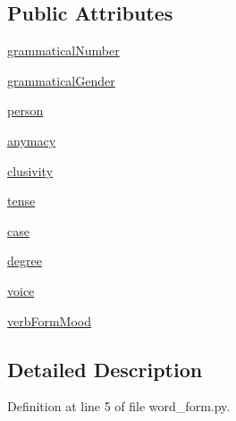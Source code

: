 \subsection*{Public Attributes}
\begin{DoxyCompactItemize}
\item 
\hyperlink{classsrc_1_1morphology_1_1word__form_1_1_word_form_affc0a3ba96904019be2b92d55e832bcb}{grammatical\+Number}
\item 
\hyperlink{classsrc_1_1morphology_1_1word__form_1_1_word_form_a44467b3575140671b680bca5ee0b0483}{grammatical\+Gender}
\item 
\hyperlink{classsrc_1_1morphology_1_1word__form_1_1_word_form_a8c2487c9b360cc067bcb40ee7cf8d8c5}{person}
\item 
\hyperlink{classsrc_1_1morphology_1_1word__form_1_1_word_form_aa82c3234c1c9f209b7b8d6b2e3c3c246}{anymacy}
\item 
\hyperlink{classsrc_1_1morphology_1_1word__form_1_1_word_form_a04e4f04ce56e4a9628b8ceea29b4573c}{clusivity}
\item 
\hyperlink{classsrc_1_1morphology_1_1word__form_1_1_word_form_a1436b5d9574c2a0096b46fa607424576}{tense}
\item 
\hyperlink{classsrc_1_1morphology_1_1word__form_1_1_word_form_ab7de838ba2c0638094e58d2decd238af}{case}
\item 
\hyperlink{classsrc_1_1morphology_1_1word__form_1_1_word_form_adf2ee9bb3f0c2618cb4aaa6065300531}{degree}
\item 
\hyperlink{classsrc_1_1morphology_1_1word__form_1_1_word_form_ac6fbf70d32545170d2b203a58532706d}{voice}
\item 
\hyperlink{classsrc_1_1morphology_1_1word__form_1_1_word_form_a5af5bbdaf2247140e5379dbcf4994ec9}{verb\+Form\+Mood}
\end{DoxyCompactItemize}


\subsection{Detailed Description}


Definition at line 5 of file word\+\_\+form.\+py.



